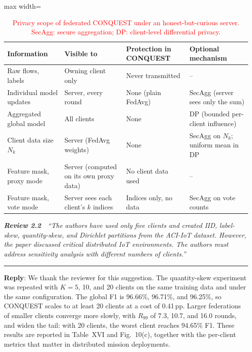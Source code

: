 \documentclass[11pt]{article}
\newcommand{\review}[2]{\par\bigskip\noindent\textbf{\textit{Review #1}}\ \ \textit{``#2''}\par\smallskip\hrule\medskip}
\newcommand{\reply}{\noindent\textbf{Reply}: }
\begin{document}
\setcounter{table}{7}
\begin{table}[H]
\centering
\scriptsize
\caption{\textcolor{red}{Privacy scope of federated CONQUEST
under an honest-but-curious server. SecAgg: secure aggregation; DP:
client-level differential privacy.}}

\color{red}
\setlength{\tabcolsep}{3pt}
\renewcommand{\arraystretch}{1.08}
\begin{adjustbox}{max width=\linewidth}
\begin{tabular}{p{1.7cm} p{1.6cm} p{1.75cm} p{1.75cm}}
\hline\toprule
\textbf{Information} & \textbf{Visible to} & \textbf{Protection in CONQUEST} & \textbf{Optional mechanism} \\
\hline\toprule
Raw flows, labels & Owning client only & Never transmitted & -- \\
Individual model updates & Server, every round & None (plain FedAvg) & SecAgg (server sees only the sum) \\
Aggregated global model & All clients & None & DP (bounded per-client influence) \\
Client data size $N_k$ & Server (FedAvg weights) & None & SecAgg on $N_k$; uniform mean in DP \\
Feature mask, proxy mode & Server (computed on its own proxy data) & No client data used & -- \\
Feature mask, vote mode & Server sees each client's $k$ indices & Indices only, no data & SecAgg on vote counts \\
\hline\toprule
\end{tabular}
\end{adjustbox}
\end{table}

\review{2.2}{The authors have used only five clients and created IID, label-skew, quantity-skew, and Dirichlet partitions from the ACI-IoT dataset. However, the paper discussed critical distributed IoT environments. The authors must address sensitivity analysis with different numbers of clients.}

\reply We thank the reviewer for this suggestion. The quantity-skew
experiment was repeated with $K=5$, 10, and 20 clients on the same training
data and under the same configuration. The global F1 is 96.66\%, 96.71\%, and
96.25\%, so CONQUEST scales to at least 20 clients at a cost of 0.41\,pp.
Larger federations of smaller clients converge more slowly, with $R_{99}$ of
7.3, 10.7, and 16.0 rounds, and widen the tail: with 20 clients, the worst
client reaches 94.65\% F1. These results are reported in Table~XVI and
Fig.~10(c), together with the per-client metrics that matter in distributed
mission deployments.
\end{document}
